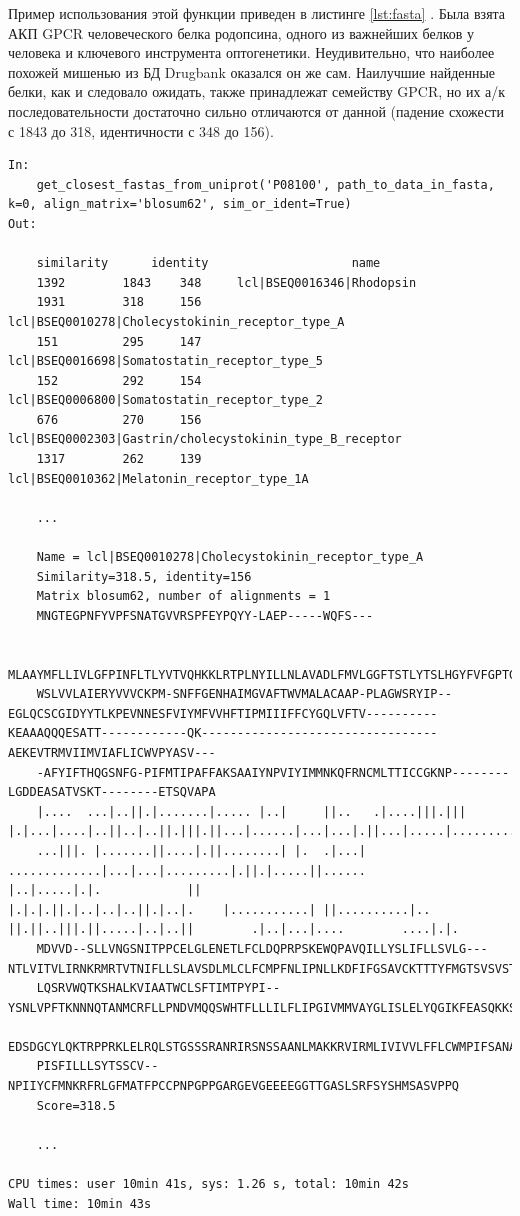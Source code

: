 \documentclass[a4paper,14pt]{article}         %
\begin{document}
Пример использования этой функции приведен в листинге \ref{lst:fasta}
\color{black}. Была взята АКП GPCR человеческого белка родопсина, одного из важнейших белков у человека и ключевого инструмента оптогенетики. Неудивительно, что наиболее похожей мишенью из БД Drugbank оказался он же сам. Наилучшие найденные белки, как и следовало ожидать, также принадлежат семейству GPCR, но их а/к последовательности достаточно сильно отличаются от данной (падение схожести с 1843 до 318, идентичности с 348 до 156). 

\begin{lstlisting}[label={lst:fasta}, caption={Определение сходства мишеней по а/к последовательности посредством Biopython, входные данные~--- ID Uniptor человеческого родопсина из семейства GPCR.}]
In:
	get_closest_fastas_from_uniprot('P08100', path_to_data_in_fasta, k=0, align_matrix='blosum62', sim_or_ident=True)
Out:

	similarity 		identity 					name
	1392 	 	1843 	348  	lcl|BSEQ0016346|Rhodopsin
	1931 	 	318 	156 	lcl|BSEQ0010278|Cholecystokinin_receptor_type_A
	151 	 	295 	147 	lcl|BSEQ0016698|Somatostatin_receptor_type_5
	152 	 	292 	154 	lcl|BSEQ0006800|Somatostatin_receptor_type_2
	676 	 	270 	156 	lcl|BSEQ0002303|Gastrin/cholecystokinin_type_B_receptor
	1317 	 	262 	139 	lcl|BSEQ0010362|Melatonin_receptor_type_1A

	...
	
	Name = lcl|BSEQ0010278|Cholecystokinin_receptor_type_A
	Similarity=318.5, identity=156
	Matrix blosum62, number of alignments = 1
	MNGTEGPNFYVPFSNATGVVRSPFEYPQYY-LAEP-----WQFS---
	
	MLAAYMFLLIVLGFPINFLTLYVTVQHKKLRTPLNYILLNLAVADLFMVLGGFTSTLYTSLHGYFVFGPTGCNLEGFFATLGGEIAL	
	WSLVVLAIERYVVVCKPM-SNFFGENHAIMGVAFTWVMALACAAP-PLAGWSRYIP--EGLQCSCGIDYYTLKPEVNNESFVIYMFVVHFTIPMIIIFFCYGQLVFTV----------KEAAAQQQESATT------------QK---------------------------------AEKEVTRMVIIMVIAFLICWVPYASV---
	-AFYIFTHQGSNFG-PIFMTIPAFFAKSAAIYNPVIYIMMNKQFRNCMLTTICCGKNP--------LGDDEASATVSKT--------ETSQVAPA
	|....  ...|..||.|.......|..... |..|     ||..   .|....|||.|||   |.|...|....|..||..|..||.|||.||...|......|...|...|.||...|.....|...........||....|||
	...|||. |.......||....|.||........| |.  .|...|  .............|...|...|.........|.||.|.....||......          |..|.....|.|.            ||                                 |.|.|.||.|..|..|..||.|..|.    |...........| ||..........|..  ||.||..|||.||.....|..|..||        .|..|...|....        ....|.|.
	MDVVD--SLLVNGSNITPPCELGLENETLFCLDQPRPSKEWQPAVQILLYSLIFLLSVLG---NTLVITVLIRNKRMRTVTNIFLLSLAVSDLMLCLFCMPFNLIPNLLKDFIFGSAVCKTTTYFMGTSVSVSTFNLVAISLERYGAICKP
	LQSRVWQTKSHALKVIAATWCLSFTIMTPYPI--YSNLVPFTKNNNQTANMCRFLLPNDVMQQSWHTFLLLILFLIPGIVMMVAYGLISLELYQGIKFEASQKKSAKERKPSTTSSGKY
	EDSDGCYLQKTRPPRKLELRQLSTGSSSRANRIRSNSSAANLMAKKRVIRMLIVIVVLFFLCWMPIFSANAWRAYDTASAERRLSGT
	PISFILLLSYTSSCV--NPIIYCFMNKRFRLGFMATFPCCPNPGPPGARGEVGEEEEGGTTGASLSRFSYSHMSASVPPQ
	Score=318.5
	
	...
	
CPU times: user 10min 41s, sys: 1.26 s, total: 10min 42s
Wall time: 10min 43s
\end{lstlisting}
\end{document}
